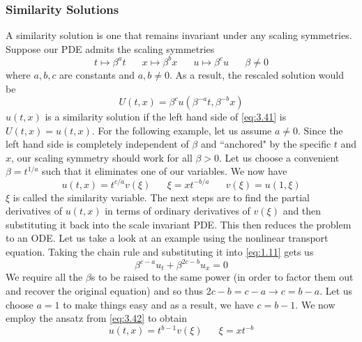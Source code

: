 \documentclass{article}
\numberwithin{equation}{section}
\begin{document}
\subsubsection{Similarity Solutions}
A similarity solution is one that remains invariant under any scaling symmetries. Suppose our PDE admits the scaling symmetries
\begin{equation}
    t\mapsto\beta^at \hspace{20pt} x\mapsto\beta^bx \hspace{20pt} u\mapsto\beta^cu \hspace{20pt}\beta\neq 0
\end{equation}
where $a,b,c$ are constants and $a,b \neq0$. As a result, the rescaled solution would be 
\begin{equation}
    U(t,x) = \beta^cu(\beta^{-a}t,\beta^{-b}x) \label{eq:3.41}
\end{equation}
$u(t,x)$ is a similarity solution if the left hand side of \eqref{eq:3.41} is $U(t,x) = u(t,x)$. For the following example, let us assume $a\neq 0$. Since the left hand side is completely independent of $\beta$ and ``anchored" by the specific $t$ and $x$, our scaling symmetry should work for all $\beta > 0$. Let us choose a convenient $\beta = t^{1/a}$ such that it eliminates one of our variables. We now have 
\begin{equation}
    u(t,x) =t^{c/a}v(\xi) \hspace{20pt} \xi = xt^{-b/a} \hspace{20pt} v(\xi) = u(1,\xi) \label{eq:3.42}
\end{equation}
$\xi$ is called the similarity variable. The next steps are to find the partial derivatives of $u(t,x)$ in terms of ordinary derivatives of $v(\xi)$ and then substituting it back into the scale invariant PDE. This then reduces the problem to an ODE. Let us take a look at an example using the nonlinear transport equation. Taking the chain rule and substituting it into \eqref{eq:1.11} gets us 
\begin{equation}
    \beta^{c-a}u_t+\beta^{2c-b}u_{x} = 0
\end{equation}
We require all the $\beta$s to be raised to the same power (in order to factor them out and recover the original equation) and so thus $2c-b=c-a \rightarrow c=b-a$. Let us choose $a=1$ to make things easy and as a result, we have $c=b-1$. We now employ the ansatz from \eqref{eq:3.42} to obtain 
\begin{equation}
    u(t,x) =t^{b-1}v(\xi) \hspace{20pt} \xi =xt^{-b} \label{eq:3.44}
\end{equation}
\end{document}
